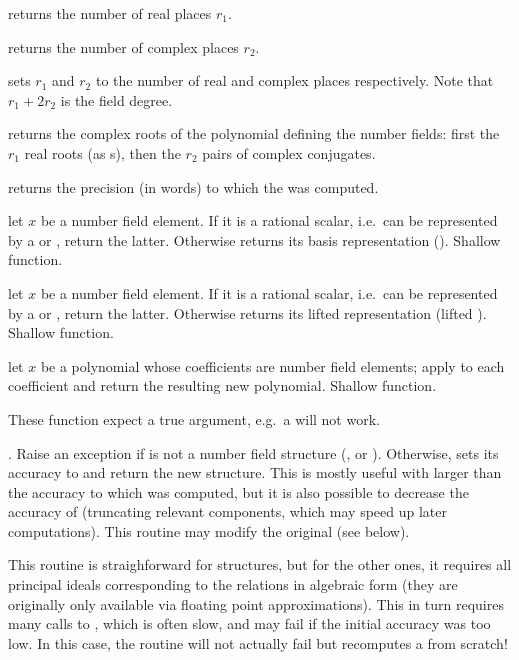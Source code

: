  returns the number of real places $r_1$.

 returns the number of complex places $r_2$.

 sets $r_1$ and $r_2$
to the number of real and complex places respectively. Note that
$r_1+2r_2$ is the field degree.

 returns the complex roots of the polynomial
defining the number fields: first the $r_1$ real roots (as s),
then the $r_2$ pairs of complex conjugates.

 returns the precision (in words) to which the
 was computed.

 let $x$ be a number field
element. If it is a rational scalar, i.e.~can be represented by a 
or , return the latter. Otherwise returns its basis representation
(). Shallow function.

 let $x$ be a number field
element. If it is a rational scalar, i.e.~can be represented by a 
or , return the latter. Otherwise returns its lifted 
representation (lifted ). Shallow function.

 let $x$ be a polynomial whose coefficients
are number field elements; apply  to each
coefficient and return the resulting new polynomial. Shallow function.


These function expect a true  argument, e.g.~a  will not
work.


. Raise an exception if 
is not a number field structure (,  or ).
Otherwise, sets its accuracy to  and return the new structure.
This is mostly useful with  larger than the accuracy to
which  was computed, but it is also possible to decrease the accuracy
of  (truncating relevant components, which may speed up later
computations). This routine may modify the original  (see below).

This routine is straighforward for  structures, but for the
other ones, it requires all principal ideals corresponding to the 
relations in algebraic form (they are originally only available via floating
point approximations). This in turn requires many calls to
, which is often slow, and may fail if the initial
accuracy was too low. In this case, the routine will not actually fail but
recomputes a  from scratch!

